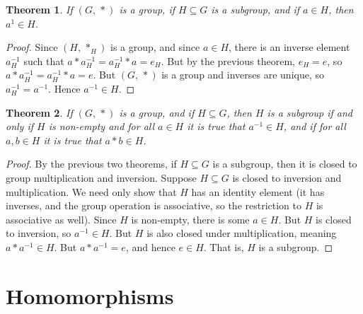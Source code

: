 \documentclass{article}
\theoremstyle{plain}
\newtheorem{theorem}{Theorem}[section]
\theoremstyle{normal}
\begin{document}
        \begin{theorem}
            If $(G,\,*)$ is a group, if $H\subseteq{G}$ is a subgroup, and
            if $a\in{H}$, then $a^{1}\in{H}$.
        \end{theorem}
        \begin{proof}
            Since $(H,\,*_{H})$ is a group, and since $a\in{H}$, there is an
            inverse element $a_{H}^{-1}$ such that
            $a*a_{H}^{-1}=a_{H}^{-1}*a=e_{H}$. But by the previous theorem,
            $e_{H}=e$, so $a*a_{H}^{-1}=a_{H}^{-1}*a=e$. But $(G,\,*)$ is a
            group and inverses are unique, so $a_{H}^{-1}=a^{-1}$. Hence
            $a^{-1}\in{H}$.
        \end{proof}
        \begin{theorem}
            If $(G,\,*)$ is a group, and if $H\subseteq{G}$, then $H$ is a
            subgroup if and only if $H$ is non-empty and for all $a\in{H}$
            it is true that $a^{-1}\in{H}$, and if for all $a,b\in{H}$ it is
            true that $a*b\in{H}$.
        \end{theorem}
        \begin{proof}
            By the previous two theorems, if $H\subseteq{G}$ is a subgroup,
            then it is closed to group multiplication and inversion. Suppose
            $H\subseteq{G}$ is closed to inversion and multiplication. We need
            only show that $H$ has an identity element (it has inverses, and
            the group operation is associative, so the restriction to $H$ is
            associative as well). Since $H$ is non-empty, there is some
            $a\in{H}$. But $H$ is closed to inversion, so $a^{-1}\in{H}$. But
            $H$ is also closed under multiplication, meaning $a*a^{-1}\in{H}$.
            But $a*a^{-1}=e$, and hence $e\in{H}$. That is, $H$ is a subgroup.
        \end{proof}
    \section{Homomorphisms}
\end{document}
